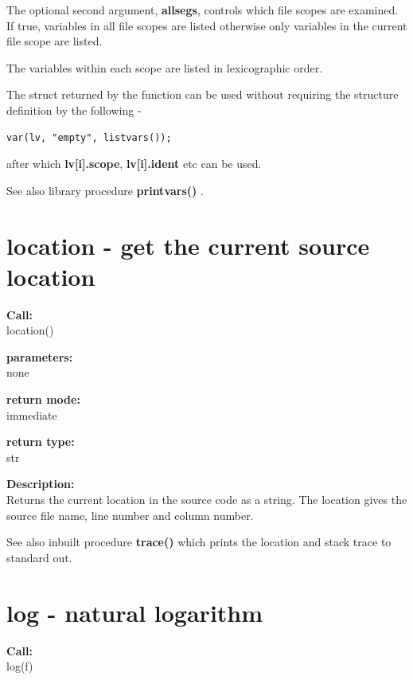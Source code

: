         The optional second argument, {\bf allsegs}, controls which file scopes
        are examined. If true, variables in all file scopes are listed otherwise
        only variables in the current file scope are listed.
        
        The variables within each scope are listed in lexicographic order.
        
        The struct returned by the function can be used without requiring the
        structure definition by the following -
        \begin{lstlisting}[gobble=8, language=threepl]
           var(lv, "empty", listvars());
        \end{lstlisting}
        after which {\bf lv[i].scope}, {\bf lv[i].ident} etc can be used.
        
        See also library procedure {\bf printvars()} .
 

    \section{location - get the current source location}\label{sec:iflocation}
        
        {\bf Call:} \\
        location()
        
        {\bf parameters:} \\
        none
        
        {\bf return mode:} \\
        immediate

        {\bf return type:} \\
        str
        
        {\bf Description:} \\
        Returns the current location in the source code as a string. The
        location gives the source file name, line number and column number.
        
        See also inbuilt procedure {\bf trace()} 
        which prints the location and stack trace to standard out.


    \section{log - natural logarithm}\label{sec:iflog}
            
        {\bf Call:} \\
        log(f)
        
